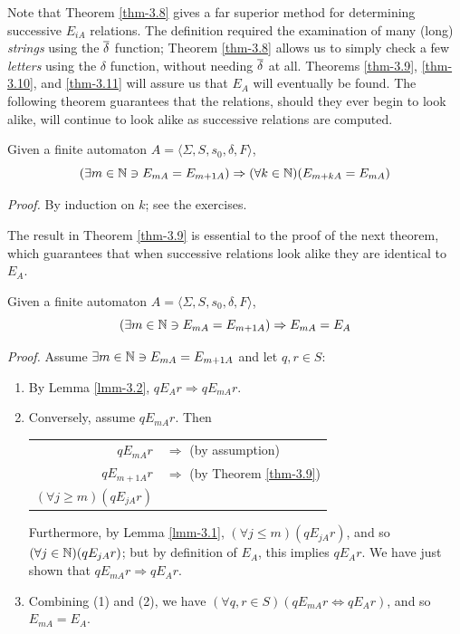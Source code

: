 Note that Theorem \ref{thm-3.8} gives a far superior method for determining successive
$E_{iA}$ relations. The definition required the examination of many (long)
\emph{strings} using the $\overline{\delta}$ function; Theorem \ref{thm-3.8} allows us to simply check
a few \emph{letters} using the $\delta$ function, without needing $\overline{\delta}$ at all. Theorems \ref{thm-3.9},
\ref{thm-3.10}, and \ref{thm-3.11} will assure us that $E_A$ will eventually be
found. The following theorem guarantees that the relations, should they ever
begin to look alike, will continue to look alike as successive relations are
computed.

\begin{thm}\label{thm-3.9}
Given a finite automaton $A =\langle\Sigma,S,s_0,\delta,F\rangle$,
\[ (\exists m \in \mathbb{N} \ni E_{mA} = E_{m+1A}) \Rightarrow
	(\forall k \in \mathbb{N})(E_{m+kA} = E_{mA}) \]

\emph{Proof.} By induction on $k$; see the exercises.
\end{thm}

The result in Theorem \ref{thm-3.9} is essential to the proof of the next
theorem, which guarantees that when successive relations look alike they are
identical to $E_A$.

\begin{thm}\label{thm-3.10}
Given a finite automaton $A =\langle\Sigma,S,s_0,\delta,F\rangle$,
\[ (\exists m \in \mathbb{N} \ni E_{mA}=E_{m+1A}) \Rightarrow E_{mA}=E_A \]

\emph{Proof.} Assume $\exists m \in \mathbb{N} \ni E_{mA}=E_{m+1A}$ and let
$q,r \in S$:
\begin{enumerate}
\item By Lemma \ref{lmm-3.2}, $q E_A r \Rightarrow q E_{mA} r$.
\item Conversely, assume $q E_{mA} r$. Then
\begin{center}
\begin{tabular}{rl}
$q E_{mA}r$ & $\Rightarrow$ (by assumption) \\
$q E_{m+1A} r$ & $\Rightarrow$ (by Theorem \ref{thm-3.9}) \\
$(\forall j \geq m)(q E_{jA} r)$ &
\end{tabular}
\end{center}
Furthermore, by Lemma \ref{lmm-3.1}, $(\forall j \leq m)(q E_{jA} r)$, and so
$(\forall j \in \mathbb{N})(q E_{jA} r)$; but by definition of $E_A$, this implies
$q E_A r$. We have just shown that $q E_{mA} r \Rightarrow q E_A r$.
\item Combining (1) and (2), we have
$(\forall q,r \in S)(q E_{mA} r \Leftrightarrow q E_A r)$, and so $E_{mA}=E_A$.
\end{enumerate}
\end{thm}

